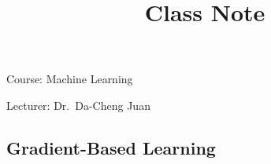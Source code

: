 \documentclass{article}
\numberwithin{equation}{section}
\begin{document}
\title{Class Note}
\Large{Course: Machine Learning}

\Large{Lecturer: Dr.\ Da-Cheng Juan}
%
%
%
\setcounter{section}{6}
\setcounter{subsection}{1}
\renewcommand\thefigure{\thesection.\arabic{figure}}
\subsection{Gradient-Based Learning}
\label{Ch6.2}

%
%
\end{document}

